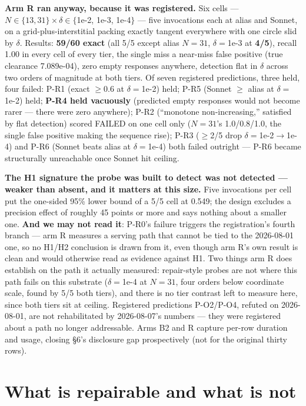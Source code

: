 \textbf{Arm R ran anyway, because it was registered.} Six cells --- $N \in \{13, 31\} \times \delta \in \{$1e-2, 1e-3, 1e-4$\}$ --- five invocations each at alias and Sonnet, on a grid-plus-interstitial packing exactly tangent everywhere with one circle slid by $\delta$. Results: \textbf{59/60 exact} (all 5/5 except alias $N=31$, $\delta=$1e-3 at \textbf{4/5}), recall 1.00 in every cell of every tier, the single miss a near-miss false positive (true clearance 7.089e-04), zero empty responses anywhere, detection flat in $\delta$ across two orders of magnitude at both tiers. Of seven registered predictions, three held, four failed: P-R1 (exact $\ge$0.6 at $\delta=$1e-2) held; P-R5 (Sonnet $\ge$ alias at $\delta=$1e-2) held; \textbf{P-R4 held vacuously} (predicted empty responses would not become rarer --- there were zero anywhere); P-R2 (``monotone non-increasing,'' satisfied by flat detection) scored FAILED on one cell only ($N=31$'s 1.0/0.8/1.0, the single false positive making the sequence rise); P-R3 ($\ge$2/5 drop $\delta=$1e-2$\to$1e-4) and P-R6 (Sonnet beats alias at $\delta=$1e-4) both failed outright --- P-R6 became structurally unreachable once Sonnet hit ceiling.

\textbf{The H1 signature the probe was built to detect was not detected --- weaker than absent, and it matters at this size.} Five invocations per cell put the one-sided 95\% lower bound of a 5/5 cell at 0.549; the design excludes a precision effect of roughly 45 points or more and says nothing about a smaller one. \textbf{And we may not read it}: P-R0's failure triggers the registration's fourth branch --- arm R measures a serving path that cannot be tied to the 2026-08-01 one, so no H1/H2 conclusion is drawn from it, even though arm R's own result is clean and would otherwise read as evidence against H1. Two things arm R does establish on the path it actually measured: repair-style probes are not where this path fails on this substrate ($\delta=$1e-4 at $N=31$, four orders below coordinate scale, found by 5/5 both tiers), and there is no tier contrast left to measure here, since both tiers sit at ceiling. Registered predictions P-O2/P-O4, refuted on 2026-08-01, are not rehabilitated by 2026-08-07's numbers --- they were registered about a path no longer addressable. Arms B2 and R capture per-row duration and usage, closing \S6's disclosure gap prospectively (not for the original thirty rows).

\section{What is repairable and what is not}

